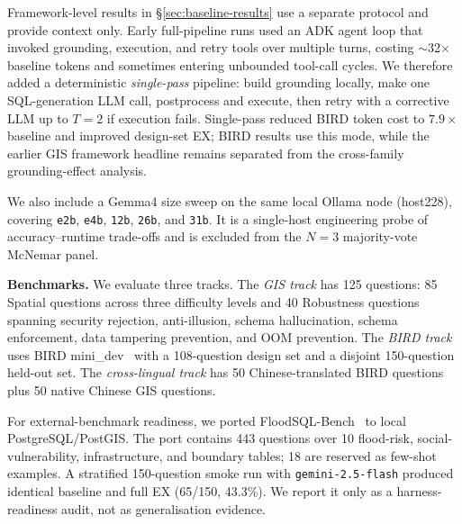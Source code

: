 Framework-level results in \S\ref{sec:baseline-results} use a separate protocol and provide context only. Early full-pipeline runs used an ADK agent loop that invoked grounding, execution, and retry tools over multiple turns, costing $\sim$32$\times$ baseline tokens and sometimes entering unbounded tool-call cycles. We therefore added a deterministic \emph{single-pass} pipeline: build grounding locally, make one SQL-generation LLM call, postprocess and execute, then retry with a corrective LLM up to $T=2$ if execution fails. Single-pass reduced BIRD token cost to $7.9\times$ baseline and improved design-set EX; BIRD results use this mode, while the earlier GIS framework headline remains separated from the cross-family grounding-effect analysis.

We also include a Gemma4 size sweep on the same local Ollama node (host228), covering \texttt{e2b}, \texttt{e4b}, \texttt{12b}, \texttt{26b}, and \texttt{31b}. It is a single-host engineering probe of accuracy--runtime trade-offs and is excluded from the $N{=}3$ majority-vote McNemar panel.

\medskip
\noindent\textbf{Benchmarks.} We evaluate three tracks. The \emph{GIS track} has 125 questions: 85 Spatial questions across three difficulty levels and 40 Robustness questions spanning security rejection, anti-illusion, schema hallucination, schema enforcement, data tampering prevention, and OOM prevention. The \emph{BIRD track} uses BIRD mini\_dev~\citep{li2023bird} with a 108-question design set and a disjoint 150-question held-out set. The \emph{cross-lingual track} has 50 Chinese-translated BIRD questions plus 50 native Chinese GIS questions.

For external-benchmark readiness, we ported FloodSQL-Bench~\citep{liu2025floodsql} to local PostgreSQL/PostGIS. The port contains 443 questions over 10 flood-risk, social-vulnerability, infrastructure, and boundary tables; 18 are reserved as few-shot examples. A stratified 150-question smoke run with \texttt{gemini-2.5-flash} produced identical baseline and full EX (65/150, 43.3\%). We report it only as a harness-readiness audit, not as generalisation evidence.

\begin{table}[t]
\centering
\footnotesize
\caption{CQ-125 Spatial-subset profile. Predicate families may overlap because one question can require more than one spatial operation. The 40-question Robustness subset is reported separately.}
\label{tab:cq-profile}

\end{table}

